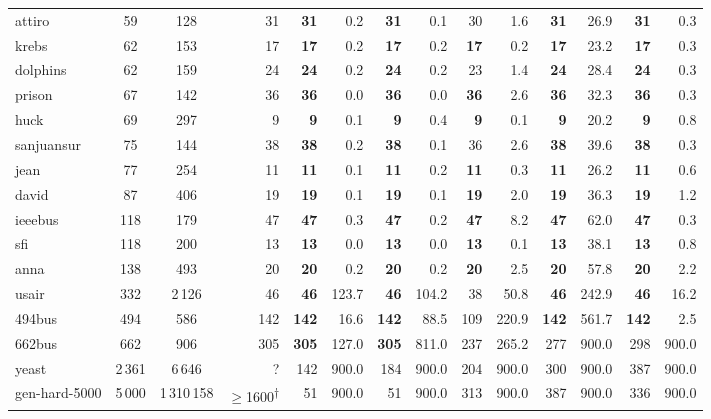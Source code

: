 \begin{table}[H]
{\begin{tabular}{lccr|rr|rr|rr|rr|rr}
attiro           & 59   & 128      & 31   & \textbf{31} & 0.2   & \textbf{31} & 0.1   & 30          & 1.6   & \textbf{31} & 26.9  & \textbf{31} & 0.3  \\
krebs            & 62   & 153      & 17   & \textbf{17} & 0.2   & \textbf{17} & 0.2   & \textbf{17} & 0.2   & \textbf{17} & 23.2  & \textbf{17} & 0.3  \\
dolphins         & 62   & 159      & 24   & \textbf{24} & 0.2   & \textbf{24} & 0.2   & 23          & 1.4   & \textbf{24} & 28.4  & \textbf{24} & 0.3  \\
prison           & 67   & 142      & 36   & \textbf{36} & 0.0   & \textbf{36} & 0.0   & \textbf{36} & 2.6   & \textbf{36} & 32.3  & \textbf{36} & 0.3  \\
huck             & 69   & 297      & 9    & \textbf{9}  & 0.1   & \textbf{9}  & 0.4   & \textbf{9}  & 0.1   & \textbf{9}  & 20.2  & \textbf{9}  & 0.8  \\
sanjuansur       & 75   & 144      & 38   & \textbf{38} & 0.2   & \textbf{38} & 0.1   & 36          & 2.6   & \textbf{38} & 39.6  & \textbf{38} & 0.3  \\
jean             & 77   & 254      & 11   & \textbf{11} & 0.1   & \textbf{11} & 0.2   & \textbf{11} & 0.3   & \textbf{11} & 26.2  & \textbf{11} & 0.6  \\
david            & 87   & 406      & 19   & \textbf{19} & 0.1   & \textbf{19} & 0.1   & \textbf{19} & 2.0   & \textbf{19} & 36.3  & \textbf{19} & 1.2  \\
ieeebus          & 118  & 179      & 47   & \textbf{47} & 0.3   & \textbf{47} & 0.2   & \textbf{47} & 8.2   & \textbf{47} & 62.0  & \textbf{47} & 0.3  \\
sfi              & 118  & 200      & 13   & \textbf{13} & 0.0   & \textbf{13} & 0.0   & \textbf{13} & 0.1   & \textbf{13} & 38.1  & \textbf{13} & 0.8  \\
anna             & 138  & 493      & 20   & \textbf{20} & 0.2   & \textbf{20} & 0.2   & \textbf{20} & 2.5   & \textbf{20} & 57.8  & \textbf{20} & 2.2  \\
\midrule
usair            & 332  & 2\,126   & 46   & \textbf{46} & 123.7 & \textbf{46} & 104.2 & 38          & 50.8  & \textbf{46} & 242.9 & \textbf{46} & 16.2 \\
494bus           & 494  & 586      & 142  & \textbf{142}& 16.6  & \textbf{142}& 88.5  & 109         & 220.9 & \textbf{142}& 561.7 & \textbf{142}& 2.5  \\
662bus           & 662  & 906      & 305  & \textbf{305}& 127.0 & \textbf{305}& 811.0 & 237         & 265.2 & 277         & 900.0 & 298         & 900.0  \\
yeast            & 2\,361 & 6\,646 & ?    & 142         & 900.0 & 184         & 900.0 & 204         & 900.0 & 300         & 900.0 & 387         & 900.0\\
gen-hard-5000    & 5\,000 & 1\,310\,158 & $\geq$1600\textsuperscript{$\dagger$} & 51 & 900.0 & 51 & 900.0 & 313 & 900.0 & 387 & 900.0 & 336 & 900.0 \\
\bottomrule
\end{tabular}%
}
\vspace{0.2cm}


\end{table}
